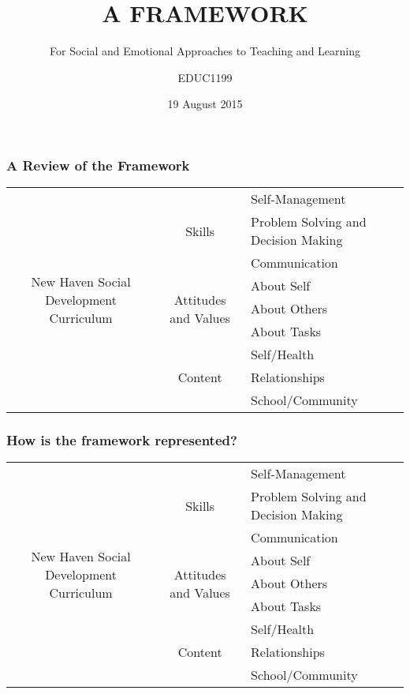 \documentclass[aspectratio=169]{beamer}
\author{EDUC1199}
\date{19 August 2015}
\title{\Huge\textsf{A FRAMEWORK}\normalsize}
\subtitle{For Social and Emotional Approaches to Teaching and Learning}
\begin{document}
	\begin{frame}

		\vfill

		\maketitle

		\vfill

	\end{frame}

	\begin{frame}
		\frametitle{\textsf{A Review of the Framework}}
		\footnotesize\begin{tabular}{ccl}
			\toprule
			\multirow{9}{*}{\parbox[l]{3cm}{\raggedright\large New Haven Social Development Curriculum \footnotesize}} & \multirow{3}{*}{\normalsize Skills \footnotesize} & Self-Management \\
			 & & Problem Solving and Decision Making \\
			 & & Communication \\
			\cline{2-3}
			 & \multirow{3}{*}{\normalsize Attitudes and Values \footnotesize} & About Self \\
			 & & About Others \\
			 & & About Tasks \\
			 \cline{2-3}
			 & \multirow{3}{*}{\normalsize Content \footnotesize} & Self/Health \\
			 & & Relationships \\
			 & & School/Community \\
			 \bottomrule
		\end{tabular}
	\end{frame}

	\begin{frame}
		\frametitle{\textsf{How is the framework represented?}}
		\footnotesize\begin{tabular}{ccl}
			\toprule
			\multirow{9}{*}{\parbox[l]{3cm}{\raggedright\large New Haven Social Development Curriculum \footnotesize}} & \multirow{3}{*}{\normalsize Skills \footnotesize} & Self-Management \\
			 & & Problem Solving and Decision Making \\
			 & & Communication \\
			\cline{2-3}
			 & \multirow{3}{*}{\normalsize Attitudes and Values \footnotesize} & About Self \\
			 & & About Others \\
			 & & About Tasks \\
			 \cline{2-3}
			 & \multirow{3}{*}{\normalsize Content \footnotesize} & Self/Health \\
			 & & Relationships \\
			 & & School/Community \\
			 \bottomrule
		\end{tabular}
	\end{frame}
\end{document}
